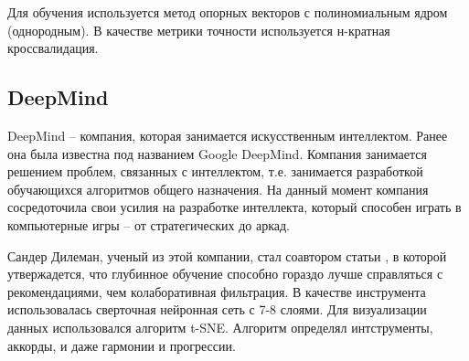 Для обучения используется метод опорных векторов с полиномиальным ядром (однородным). В качестве метрики точности используется н-крат\-ная кроссвалидация.

\subsection{DeepMind}
\label{sec:analogues:deepmind}
DeepMind -- компания, которая занимается искусственным интеллектом. Ранее она была известна под названием Google DeepMind. Компания занимается решением проблем, связанных с интеллектом, т.е. занимается разработкой обучающихся алгоритмов общего назначения. На данный момент компания сосредоточила свои усилия на разработке интеллекта, который \linebreak способен играть в компьютерные игры -- от стратегических до аркад.

Сандер Дилеман, ученый из этой компании, стал соавтором статьи \cite{deepcontent}, в которой утвержадется, что глубинное обучение способно гораздо лучше справляться с рекомендациями, чем колаборативная фильтрация. В качестве инструмента использовалась сверточная нейронная сеть с 7-8 слоями. Для визуализации данных использовался алгоритм t-SNE. Алгоритм определял интструменты, аккорды, и даже гармонии и прогрессии.
